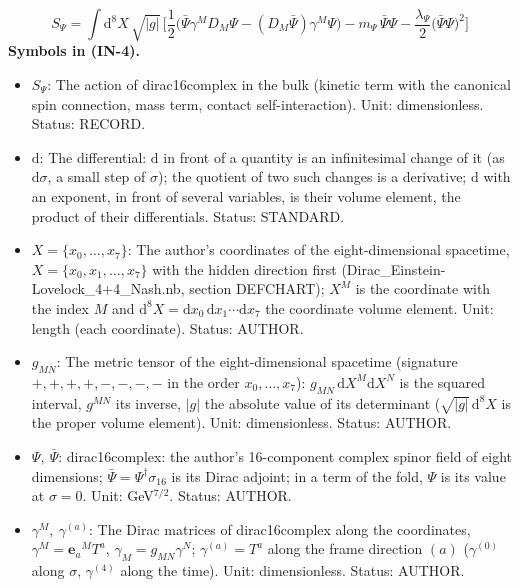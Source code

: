 \documentclass[
  10pt,
]{article}
\providecommand{\tightlist}{%
  \setlength{\itemsep}{0pt}\setlength{\parskip}{0pt}}
\begin{document}
\[
S_\Psi = \int\mathrm{d}^8X\,\sqrt{\lvert g\rvert}\,\Big[\frac12\big(\bar\Psi\gamma^MD_M\Psi - (D_M\bar\Psi)\gamma^M\Psi\big)
 - m_\Psi\,\bar\Psi\Psi - \frac{\lambda_\Psi}{2}\big(\bar\Psi\Psi\big)^2\Big] \tag{IN-4}
\] \textbf{Symbols in (IN-4).}

\begin{itemize}
\tightlist
\item
  \(S_\Psi\): The action of dirac16complex in the bulk (kinetic term
  with the canonical spin connection, mass term, contact
  self-interaction). Unit: dimensionless. Status: RECORD.
\item
  \(\mathrm{d}\): The differential: \(\mathrm{d}\) in front of a
  quantity is an infinitesimal change of it (as \(\mathrm{d}\sigma\), a
  small step of \(\sigma\)); the quotient of two such changes is a
  derivative; \(\mathrm{d}\) with an exponent, in front of several
  variables, is their volume element, the product of their
  differentials. Status: STANDARD.
\item
  \(X = \{x_0, \dots, x_7\}\): The author's coordinates of the
  eight-dimensional spacetime, \(X = \{x_0, x_1, \dots, x_7\}\) with the
  hidden direction first (Dirac\_Einstein-Lovelock\_4+4\_Nash.nb,
  section DEFCHART); \(X^M\) is the coordinate with the index \(M\) and
  \(\mathrm{d}^8X = \mathrm{d}x_0\,\mathrm{d}x_1\cdots\mathrm{d}x_7\)
  the coordinate volume element. Unit: length (each coordinate). Status:
  AUTHOR.
\item
  \(g_{MN}\): The metric tensor of the eight-dimensional spacetime
  (signature \(+,+,+,+,-,-,-,-\) in the order \(x_0, \dots, x_7\)):
  \(g_{MN}\,\mathrm{d}X^M\mathrm{d}X^N\) is the squared interval,
  \(g^{MN}\) its inverse, \(\lvert g\rvert\) the absolute value of its
  determinant (\(\sqrt{\lvert g\rvert}\,\mathrm{d}^8X\) is the proper
  volume element). Unit: dimensionless. Status: AUTHOR.
\item
  \(\Psi,\ \bar\Psi\): dirac16complex: the author's 16-component complex
  spinor field of eight dimensions;
  \(\bar\Psi = \Psi^\dagger\sigma_{16}\) is its Dirac adjoint; in a term
  of the fold, \(\Psi\) is its value at \(\sigma = 0\). Unit:
  GeV\(^{7/2}\). Status: AUTHOR.
\item
  \(\gamma^M,\ \gamma^{(a)}\): The Dirac matrices of dirac16complex
  along the coordinates, \(\gamma^M = \mathbf{e}_a{}^MT^a\),
  \(\gamma_M = g_{MN}\gamma^N\); \(\gamma^{(a)} = T^a\) along the frame
  direction \((a)\) (\(\gamma^{(0)}\) along \(\sigma\), \(\gamma^{(4)}\)
  along the time). Unit: dimensionless. Status: AUTHOR.

\end{itemize}
\end{document}
